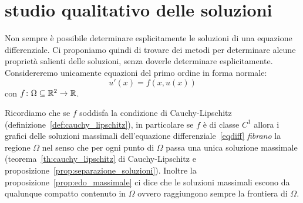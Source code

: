 \section{studio qualitativo delle soluzioni}
\label{sec:studio_qualitativo_edo}

Non sempre è possibile determinare esplicitamente le soluzioni
di una equazione differenziale.
Ci proponiamo quindi di trovare dei metodi per
determinare alcune proprietà salienti delle soluzioni, senza
doverle determinare esplicitamente.
Considereremo unicamente equazioni del primo ordine in forma normale:
\begin{equation}\label{eqdiff}
	u'(x)= f(x,u(x))
\end{equation}
con $f\colon \Omega \subseteq {\mathbb R}^2\to {\mathbb R}$.

Ricordiamo che se $f$ soddisfa la condizione di Cauchy-Lipschitz
(definizione~\ref{def:cauchy_lipschitz}), in particolare
se $f$ è di classe $C^1$ allora i grafici delle soluzioni
massimali dell'equazione differenziale~\eqref{eqdiff}
\emph{fibrano} la regione $\Omega$ nel senso che per ogni punto di
$\Omega$ passa una unica soluzione massimale (teorema~\ref{th:cauchy_lipschitz}
di Cauchy-Lipschitz e proposizione~\ref{prop:separazione_soluzioni}).
Inoltre la proposizione~\ref{prop:edo_massimale} ci dice
che le soluzioni massimali escono da qualunque compatto contenuto in
$\Omega$ ovvero raggiungono sempre la frontiera di $\Omega$.

